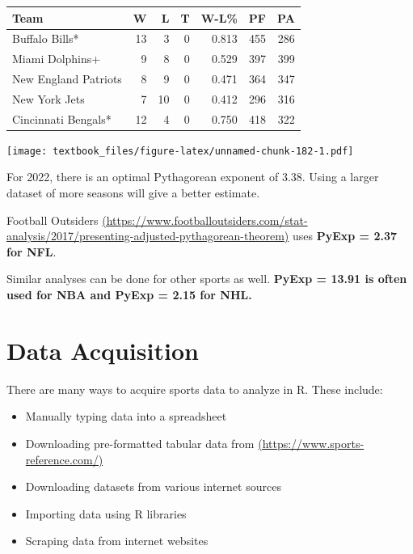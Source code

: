\documentclass[
  11pt,
]{book}
\newenvironment{Shaded}{\begin{snugshade}}{\end{snugshade}}
\newcommand{\AttributeTok}[1]{\textcolor[rgb]{0.77,0.63,0.00}{#1}}
\newcommand{\DecValTok}[1]{\textcolor[rgb]{0.00,0.00,0.81}{#1}}
\newcommand{\FunctionTok}[1]{\textcolor[rgb]{0.00,0.00,0.00}{#1}}
\newcommand{\NormalTok}[1]{#1}
\newcommand{\SpecialCharTok}[1]{\textcolor[rgb]{0.00,0.00,0.00}{#1}}
\newcommand{\StringTok}[1]{\textcolor[rgb]{0.31,0.60,0.02}{#1}}
\providecommand{\tightlist}{%
  \setlength{\itemsep}{0pt}\setlength{\parskip}{0pt}}
\theoremstyle{definition}
\theoremstyle{definition}
\theoremstyle{definition}
\theoremstyle{definition}
\theoremstyle{remark}
\begin{document}
\begin{tabular}{lrrrrrr}
\toprule
Team & W & L & T & W-L\% & PF & PA\\
\midrule
Buffalo Bills* & 13 & 3 & 0 & 0.813 & 455 & 286\\
Miami Dolphins+ & 9 & 8 & 0 & 0.529 & 397 & 399\\
New England Patriots & 8 & 9 & 0 & 0.471 & 364 & 347\\
New York Jets & 7 & 10 & 0 & 0.412 & 296 & 316\\
Cincinnati Bengals* & 12 & 4 & 0 & 0.750 & 418 & 322\\
\bottomrule
\end{tabular}

\begin{Shaded}
\end{Shaded}

\texttt{[image: textbook\_files/figure-latex/unnamed-chunk-182-1.pdf]}

For 2022, there is an optimal Pythagorean exponent of 3.38. Using a larger dataset of more seasons will give a better estimate.

Football Outsiders \href{https://www.footballoutsiders.com/stat-analysis/2017/presenting-adjusted-pythagorean-theorem}{(https://www.footballoutsiders.com/stat-analysis/2017/presenting-adjusted-pythagorean-theorem)} uses \textbf{PyExp = 2.37 for NFL}.

Similar analyses can be done for other sports as well. \textbf{PyExp = 13.91 is often used for NBA and PyExp = 2.15 for NHL.}

\hypertarget{data-acquisition}{%
\chapter{Data Acquisition}\label{data-acquisition}}

There are many ways to acquire sports data to analyze in R. These include:

\begin{itemize}
\tightlist
\item
  Manually typing data into a spreadsheet
\item
  Downloading pre-formatted tabular data from \href{https://www.sports-reference.com/}{(https://www.sports-reference.com/)}
\item
  Downloading datasets from various internet sources
\item
  Importing data using R libraries
\item
  Scraping data from internet websites
\end{itemize}
\end{document}
